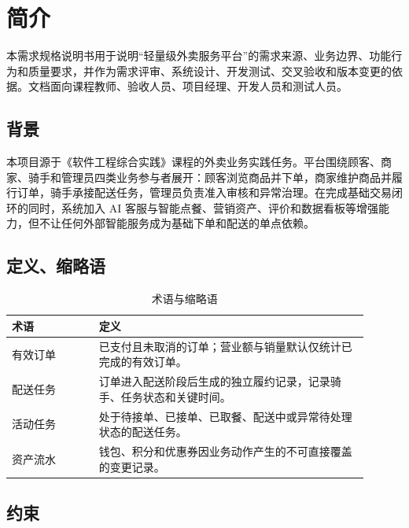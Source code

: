 \section{简介}

本需求规格说明书用于说明“轻量级外卖服务平台”的需求来源、业务边界、功能行为和质量要求，并作为需求评审、系统设计、开发测试、交叉验收和版本变更的依据。文档面向课程教师、验收人员、项目经理、开发人员和测试人员。

\subsection{背景}

本项目源于《软件工程综合实践》课程的外卖业务实践任务。平台围绕顾客、商家、骑手和管理员四类业务参与者展开：顾客浏览商品并下单，商家维护商品并履行订单，骑手承接配送任务，管理员负责准入审核和异常治理。在完成基础交易闭环的同时，系统加入 AI 客服与智能点餐、营销资产、评价和数据看板等增强能力，但不让任何外部智能服务成为基础下单和配送的单点依赖。

\subsection{定义、缩略语}

\begin{longtable}{|L{0.22\linewidth}|L{0.68\linewidth}|}
\caption{术语与缩略语}\label{tab:terms}\\ \hline
\textbf{术语} & \textbf{定义} \\ \hline
有效订单 & 已支付且未取消的订单；营业额与销量默认仅统计已完成的有效订单。 \\ \hline
配送任务 & 订单进入配送阶段后生成的独立履约记录，记录骑手、任务状态和关键时间。 \\ \hline
活动任务 & 处于待接单、已接单、已取餐、配送中或异常待处理状态的配送任务。 \\ \hline
资产流水 & 钱包、积分和优惠券因业务动作产生的不可直接覆盖的变更记录。 \\ \hline
\end{longtable}

\subsection{约束}


